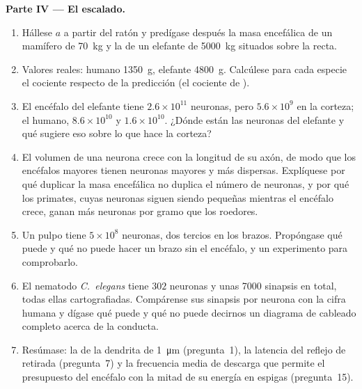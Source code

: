 \begin{problem}
\medskip
\noindent\textbf{Parte IV --- El escalado.}
\begin{enumerate}[resume]
  \item Hállese $a$ a partir del ratón y predígase después la masa
        encefálica de un mamífero de \qty{70}{kg} y la de un elefante
        de \qty{5000}{kg} situados sobre la recta.
  \item Valores reales: humano \qty{1350}{g}, elefante \qty{4800}{g}.
        Calcúlese para cada especie el cociente respecto de la
        predicción (el cociente de ).
  \item El encéfalo del elefante tiene $2.6\times 10^{11}$ neuronas,
        pero $5.6\times 10^{9}$ en la corteza; el humano,
        $8.6\times 10^{10}$ y $1.6\times 10^{10}$. ¿Dónde están las
        neuronas del elefante y qué sugiere eso sobre lo que hace la
        corteza?
  \item El volumen de una neurona crece con la longitud de su axón, de
        modo que los encéfalos mayores tienen neuronas mayores y más
        dispersas. Explíquese por qué duplicar la masa encefálica no
        duplica el número de neuronas, y por qué los primates, cuyas
        neuronas siguen siendo pequeñas mientras el encéfalo crece,
        ganan más neuronas por gramo que los roedores.
  \item Un pulpo tiene $5\times 10^{8}$ neuronas, dos tercios en los
        brazos. Propóngase qué puede y qué no puede hacer un brazo sin
        el encéfalo, y un experimento para comprobarlo.
  \item El nematodo \emph{C.~elegans} tiene $302$ neuronas y unas
        \num{7000} sinapsis en total, todas ellas cartografiadas.
        Compárense sus sinapsis por neurona con la cifra humana y
        dígase qué puede y qué no puede decirnos un diagrama de
        cableado completo acerca de la conducta.
  \item Resúmase: la  de la dendrita de
        \qty{1}{\micro m} (pregunta~1), la latencia del reflejo de
        retirada (pregunta~7) y la frecuencia media de descarga que
        permite el presupuesto del encéfalo con la mitad de su energía
        en espigas (pregunta~15).
\end{enumerate}
\end{problem}
